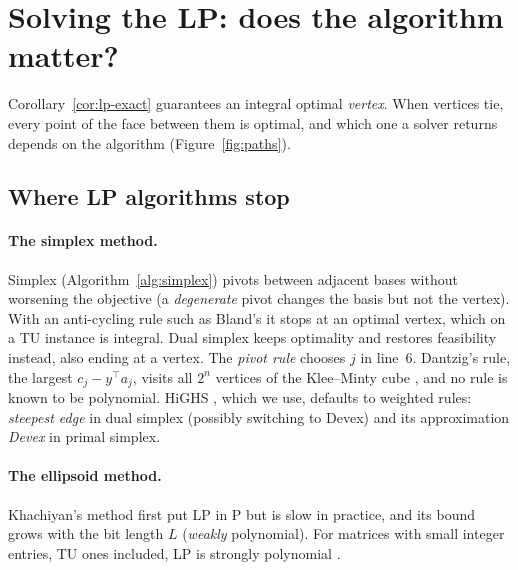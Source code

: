 \section{Solving the LP: does the algorithm matter?}\label{sec:solve}

Corollary~\ref{cor:lp-exact} guarantees an integral optimal \emph{vertex}. When vertices tie, every point of the face between them is optimal, and which one a solver returns depends on the algorithm (Figure~\ref{fig:paths}).

\subsection{Where LP algorithms stop}\label{sec:algorithms}

\paragraph{The simplex method.} Simplex \cite{dantzig1951} (Algorithm~\ref{alg:simplex}) pivots between adjacent bases without worsening the objective (a \emph{degenerate} pivot changes the basis but not the vertex). With an anti-cycling rule such as Bland's \cite{bland1977} it stops at an optimal vertex, which on a TU instance is integral. Dual simplex \cite{lemke1954} keeps optimality and restores feasibility instead, also ending at a vertex. The \emph{pivot rule} chooses $j$ in line~6. Dantzig's rule, the largest $c_j-y^\top a_j$, visits all $2^n$ vertices of the Klee--Minty cube \cite{kleeminty1972}, and no rule is known to be polynomial. HiGHS \cite{huangfu2018}, which we use, defaults to weighted rules: \emph{steepest edge} \cite{forrestgoldfarb1992} in dual simplex (possibly switching to Devex) and its approximation \emph{Devex} \cite{harris1973} in primal simplex.

\paragraph{The ellipsoid method.} Khachiyan's method \cite{khachiyan1979} first put LP in P but is slow in practice, and its bound grows with the bit length $L$ (\emph{weakly} polynomial). For matrices with small integer entries, TU ones included, LP is strongly polynomial \cite{tardos1986}.

